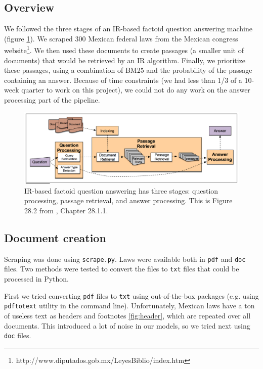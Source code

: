 \documentclass[letterpaper, margin=1in]{article}
\begin{document}
\subsection{Overview}

We followed the three stages of an IR-based factoid question answering machine (figure 	\ref{fig:pipeline}). We scraped 300 Mexican federal laws from the Mexican congress website\footnote{http://www.diputados.gob.mx/LeyesBiblio/index.htm}. We then used these documents to create passages (a smaller unit of documents) that would be retrieved by an IR algorithm. Finally, we prioritize these passages, using a combination of BM25 and the probability of the passage containing an answer. Because of time constraints (we had less than 1/3 of a 10-week quarter to work on this project), we could not do any work on the answer processing part of the pipeline.

\begin{figure}
\centering
\includegraphics[width=1\textwidth]{pipeline.png}
\caption{\label{fig:pipeline}IR-based factoid question answering has three stages: question processing, passage retrieval, and answer processing. This is Figure 28.2 from \cite{jurafsky}, Chapter 28.1.1.}
\end{figure}

\subsection{Document creation}
Scraping was done using \texttt{scrape.py}. Laws were available both in \texttt{pdf} and \texttt{doc} files. Two methods were tested to convert the files to \texttt{txt} files that could be processed in Python. 

First we tried converting \texttt{pdf} files to \texttt{txt} using out-of-the-box packages (e.g. using \texttt{pdftotext} utility in the command line). Unfortunately, Mexican laws have a ton of useless text as headers and footnotes \ref{fig:header}, which are repeated over all documents. This introduced a lot of noise in our models, so we tried next using \texttt{doc} files.
\end{document}

